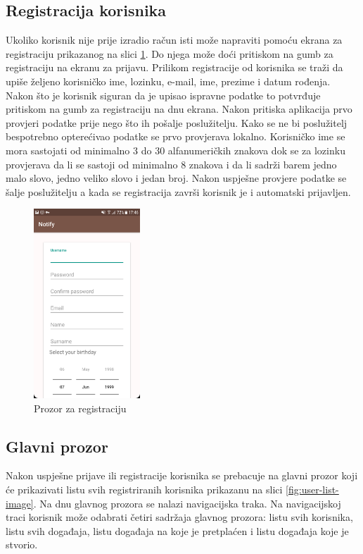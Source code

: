 \documentclass[times, utf8, zavrsni]{fer}
\begin{document}
{\subsection{Registracija korisnika}
Ukoliko korisnik nije prije izradio račun isti može napraviti pomoću ekrana za registraciju prikazanog na slici \ref{fig:register-image}. Do njega može doći pritiskom na gumb za registraciju  na ekranu za prijavu. Prilikom registracije od korisnika se traži da upiše željeno korisničko ime, lozinku, e-mail, ime, prezime i datum rođenja. Nakon što je korisnik siguran da je upisao ispravne podatke to potvrđuje pritiskom na gumb za registraciju na dnu ekrana. Nakon pritiska aplikacija prvo provjeri podatke prije nego što ih pošalje poslužitelju. Kako se ne bi poslužitelj bespotrebno opterećivao podatke se prvo provjerava lokalno. Korisničko ime se mora sastojati od minimalno 3 do 30 alfanumeričkih znakova dok se za lozinku provjerava da li se sastoji od minimalno 8 znakova i da li sadrži barem jedno malo slovo, jedno veliko slovo i jedan broj. Nakon uspješne provjere podatke se šalje poslužitelju a kada se registracija završi korisnik je i automatski prijavljen.

\begin{figure}[htb]
\centering
\includegraphics[width=4cm]{img/ss-register.png}
\caption{Prozor za registraciju}
\label{fig:register-image}
\end{figure}

\subsection{Glavni prozor}
Nakon uspješne prijave ili registracije korisnika se prebacuje na glavni prozor koji će prikazivati listu svih registriranih korisnika prikazanu na slici \ref{fig:user-list-image}. Na dnu glavnog prozora se nalazi navigacijska traka. Na navigacijskoj traci korisnik može odabrati četiri sadržaja glavnog prozora: listu svih korisnika, listu svih događaja, listu događaja na koje je pretplaćen i listu događaja koje je stvorio.

}
\end{document}
